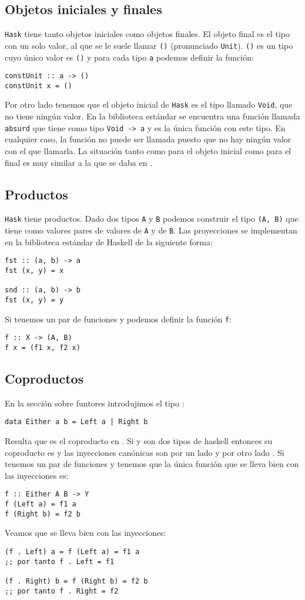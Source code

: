\subsection{Objetos iniciales y finales}
\texttt{Hask} tiene tanto objetos iniciales como objetos finales. El
objeto final es el tipo con un solo valor, al que se le suele llamar
\texttt{()} (pronunciado \texttt{Unit}). \texttt{()} es un tipo
cuyo único valor es \texttt{()} y para cada tipo \texttt{a} podemos
definir la función:
\begin{verbatim}
constUnit :: a -> ()
constUnit x = ()
\end{verbatim}
Por otro lado tenemos que el objeto inicial de \texttt{Hask} es el tipo
llamado \texttt{Void}, que no tiene ningún valor. En la biblioteca
estándar se encuentra una función llamada \texttt{absurd}
que tiene
como tipo \texttt{Void -> a} y es la única función con este tipo.
En cualquier caso, la función no puede ser llamada puesto que no
hay ningún valor con el que llamarla. La situación tanto como para
el objeto inicial como para el final es muy similar a la que se daba
en \Set.

\subsection{Productos}
\texttt{Hask} tiene productos. Dado dos tipos \texttt{A} y
\texttt{B} podemos construir el tipo \texttt{(A, B)} que tiene
como valores pares de valores de \texttt{A} y de \texttt{B}.
Las proyecciones se implementan en la biblioteca estándar de
Haskell de la siguiente forma:

\begin{verbatim}
fst :: (a, b) -> a
fst (x, y) = x

snd :: (a, b) -> b
fst (x, y) = y
\end{verbatim}

Si tenemos un par de funciones  y
 podemos definir la función \texttt{f}:
\begin{verbatim}
f :: X -> (A, B)
f x = (f1 x, f2 x)
\end{verbatim}

\subsection{Coproductos}
En la sección sobre funtores introdujimos el tipo :
\begin{verbatim}
data Either a b = Left a | Right b
\end{verbatim}
Resulta que  es el coproducto en . Si
 y  son dos tipos de haskell entonces su coproducto
es  y las inyecciones canónicas son por un lado
 y por otro lado
. Si tenemos un par de funciones
 y  tenemos que la única
función  que se lleva bien con las inyecciones
es:
\begin{verbatim}
f :: Either A B -> Y
f (Left a) = f1 a
f (Right b) = f2 b
\end{verbatim}

Veamos que se lleva bien con las inyecciones:
\begin{verbatim}
(f . Left) a = f (Left a) = f1 a
;; por tanto f . Left = f1

(f . Right) b = f (Right b) = f2 b
;; por tanto f . Right = f2
\end{verbatim}
